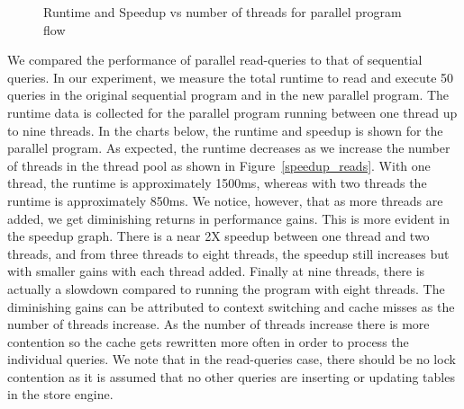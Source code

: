 \documentclass[11pt,journal,compsoc]{IEEEtran}
\begin{document}
\begin{figure}
\captionsetup{justification=centering}
\centerline{
\hfill
{}}
\caption{Runtime and Speedup vs number of threads for parallel program flow}
\label{fig:speedup_reads}
\end{figure} 

We compared the performance of parallel read-queries to that of sequential queries. In our experiment, we measure the total runtime to read and execute 50 queries in the original sequential program and in the new parallel program. The runtime data is collected for the parallel program running between one thread up to nine threads. In the charts below, the runtime and speedup is shown for the parallel program. As expected, the runtime decreases as we increase the number of threads in the thread pool as shown in Figure~\ref{speedup_reads}. With one thread, the runtime is approximately 1500ms, whereas with two threads the runtime is approximately 850ms. We notice, however, that as more threads are added, we get diminishing returns in performance gains. This is more evident in the speedup graph. There is a near 2X speedup between one thread and two threads, and from three threads to eight threads, the speedup still increases but with smaller gains with each thread added. Finally at nine threads, there is actually a slowdown compared to running the program with eight threads. The diminishing gains can be attributed to context switching and cache misses as the number of threads increase. As the number of threads increase there is more contention so the cache gets rewritten more often in order to process the individual queries. We note that in the read-queries case, there should be no lock contention as it is assumed that no other queries are inserting or updating tables in the store engine.
\end{document}
